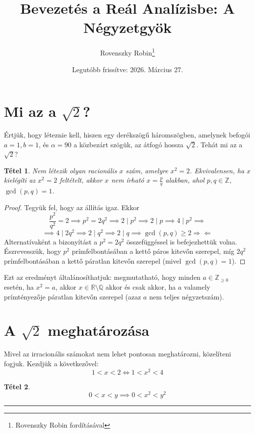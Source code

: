 \documentclass{article}
\title{Bevezetés a Reál Analízisbe: A Négyzetgyök}
\author{Rovenszky Robin\thanks{Rovenszky Robin fordításával}}
\date{Legutóbb frissítve: 2026. Március 27.}
\newtheorem{theorem}{Tétel}
\begin{document}
\maketitle
\tableofcontents
\newpage

\section{Mi az a $\sqrt{2}$?}
Értjük, hogy léteznie kell, hiszen egy derékszögű háromszögben, amelynek befogói $a = 1, b = 1$, és $\alpha = 90$ a közbezárt szögük, az átfogó hossza $\sqrt{2}$. Tehát mi az a $\sqrt{2}$?

\begin{theorem}
    Nem létezik olyan racionális $x$ szám, amelyre $x^2 = 2$. Ekvivalensen, ha $x$ kielégíti az $x^2 = 2$ feltételt, akkor $x$ nem írható $x = \frac{p}{q}$ alakban, ahol $p, q \in \mathbb{Z}$, $\gcd(p, q) = 1$.
\end{theorem}
\begin{proof}
    Tegyük fel, hogy az állítás igaz. Ekkor
    \begin{equation}
        \frac{p^2}{q^2} = 2 \implies p^2 = 2q^2 \implies 2 \mid p^2 \implies 2 \mid p \implies 4 \mid p^2 \implies
    \end{equation}
    \begin{equation}
        \implies 4 \mid 2q^2 \implies 2 \mid q^2 \implies 2 \mid q \implies \gcd(p, q) \ge 2 \Rightarrow\!\Leftarrow
    \end{equation}
    Alternatívaként a bizonyítást a $p^2 = 2q^2$ összefüggéssel is befejezhettük volna. Észrevesszük, hogy $p^2$ prímfelbontásában a kettő páros kitevőn szerepel, míg $2q^2$ prímfelbontásában a kettő páratlan kitevőn szerepel (mivel $\gcd(p,q) = 1$).
\end{proof}

Ezt az eredményt általánosíthatjuk: megmutatható, hogy minden $a \in \mathbb{Z}_{\ge 0}$ esetén, ha $x^2 = a$, akkor $x \in \mathbb{R} \setminus \mathbb{Q}$ akkor és csak akkor, ha $a$ valamely prímtényezője páratlan kitevőn szerepel (azaz $a$ nem teljes négyzetszám).

\section{A $\sqrt{2}$ meghatározása}
Mivel az irracionális számokat nem lehet pontosan meghatározni, közelíteni fogjuk. Kezdjük a következővel:
\[
1 < x < 2 \Leftrightarrow 1 < x^2 < 4
\]
\begin{theorem}
    \[
    0 < x < y \implies 0 < x^2 < y^2
    \]
\end{theorem}
\hrule
\vspace{1em}
\end{document}

